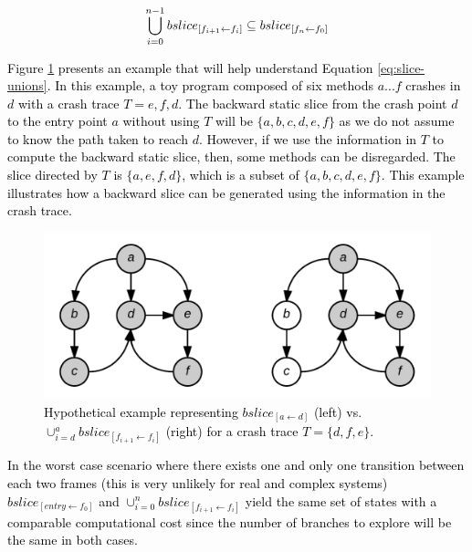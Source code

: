 \documentclass[times, doublespace]{smrauth}
\newcommand{\red}[1]{\textcolor{black}{#1}}
\begin{document}
{\begin{equation}
\centering
\begin{split}
  \red{
\bigcup_{i=0}^{n-1} bslice_{[f_{i+1} \leftarrow f_i]} \subseteq bslice_{[f_n \leftarrow f_0]}
  }
\end{split}
\label{eq:slice-unions}
\end{equation}

\red{Figure \ref{fig:jcharming-slice} presents an example that will help understand Equation \ref{eq:slice-unions}.
In this example, a toy program composed of six methods $a...f$ crashes in $d$ with a crash trace $T = {e, f, d}$.
The backward static slice from the crash point $d$ to the entry point $a$ without using $T$ will be $\{a, b, c, d, e, f\}$ as we do not assume to know the path taken to reach $d$.
However, if we use the information in $T$ to compute the backward static slice, then, some methods can be disregarded. The slice directed by $T$ is $\{a, e, f, d\}$, which is a subset of $\{a, b, c, d, e, f\}$. This example illustrates how a backward slice can be generated using the information in the crash trace. }

\begin{figure}
  \centering
    \includegraphics[scale=0.25]{media/jcharming-slices.png}
    \caption{\red{Hypothetical example representing $bslice_{[a \leftarrow d]}$ (left) vs. $\cup_{i=d}^{a} bslice_{[f_{i+1} \leftarrow f_i]}$ (right) for a crash trace $T=\{d, f, e\}$.
    \label{fig:jcharming-slice}}}
\end{figure}

\red{In the worst case scenario where there exists one and only one
transition between each two frames (this is very unlikely for real
and complex systems) $bslice_{[entry \leftarrow f_0]}$ and
 $\cup_{i=0}^n bslice_{[f_{i+1} \leftarrow f_i]}$ yield the same set of states with a
comparable computational cost since the number of branches
to explore will be the same in both cases.}


}
\end{document}

